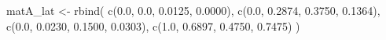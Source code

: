 \documentclass[
  12pt,
  letterpaper,
]{book}
\newenvironment{Shaded}{\begin{snugshade}}{\end{snugshade}}
\newcommand{\FloatTok}[1]{\textcolor[rgb]{0.68,0.00,0.00}{#1}}
\newcommand{\FunctionTok}[1]{\textcolor[rgb]{0.28,0.35,0.67}{#1}}
\newcommand{\NormalTok}[1]{\textcolor[rgb]{0.00,0.23,0.31}{#1}}
\newcommand{\OtherTok}[1]{\textcolor[rgb]{0.00,0.23,0.31}{#1}}
\begin{document}
\begin{Shaded}
\begin{Highlighting}[]
\NormalTok{matA\_lat }\OtherTok{\textless{}{-}} \FunctionTok{rbind}\NormalTok{(}
  \FunctionTok{c}\NormalTok{(}\FloatTok{0.0}\NormalTok{,     }\FloatTok{0.0}\NormalTok{,  }\FloatTok{0.0125}\NormalTok{,  }\FloatTok{0.0000}\NormalTok{),}
  \FunctionTok{c}\NormalTok{(}\FloatTok{0.0}\NormalTok{,  }\FloatTok{0.2874}\NormalTok{,  }\FloatTok{0.3750}\NormalTok{,  }\FloatTok{0.1364}\NormalTok{),}
  \FunctionTok{c}\NormalTok{(}\FloatTok{0.0}\NormalTok{,  }\FloatTok{0.0230}\NormalTok{,  }\FloatTok{0.1500}\NormalTok{,  }\FloatTok{0.0303}\NormalTok{),}
  \FunctionTok{c}\NormalTok{(}\FloatTok{1.0}\NormalTok{,  }\FloatTok{0.6897}\NormalTok{,   }\FloatTok{0.4750}\NormalTok{,  }\FloatTok{0.7475}\NormalTok{) }
\NormalTok{)}



\end{Highlighting}
\end{Shaded}
\end{document}

